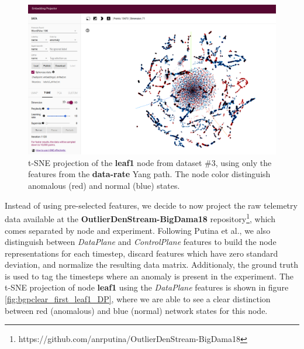 \begin{figure}[h!]
	\centering
	\includegraphics[width=0.8\linewidth]{Figure/dataset3_leaf1_data-rate.png}
	\caption{t-SNE projection of the \textbf{leaf1} node from dataset \#3, using only the features from the \textbf{data-rate} Yang path. The node color distinguish anomalous (red) and normal (blue) states.}
	\label{fig:dataset3_leaf1_data-rate}
\end{figure}

Instead of using pre-selected features, we decide to now project the raw telemetry data available at the \textbf{OutlierDenStream-BigDama18} repository\footnote{https://github.com/anrputina/OutlierDenStream-BigDama18}, which comes separated by node and experiment.
Following Putina et al., we also distinguish between \textit{DataPlane} and \textit{ControlPlane} features to build the node representations for each timestep, discard features which have zero standard deviation, and normalize the resulting data matrix.
Additionaly, the ground truth is used to tag the timesteps where an anomaly is present in the experiment.
The t-SNE projection of node \textbf{leaf1} using the \textit{DataPlane} features is shown in figure \ref{fig:bgpclear_first_leaf1_DP}, where we are able to see a clear distinction between red (anomalous) and blue (normal) network states for this node.

